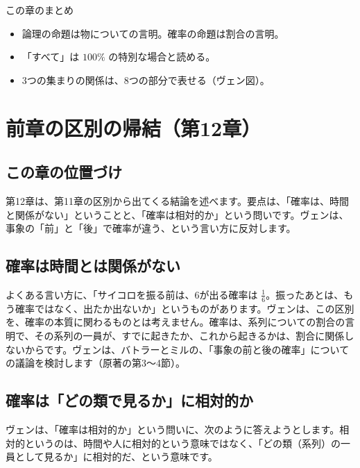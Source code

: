 \documentclass[a4paper,11pt,openany]{ltjsbook}
\begin{document}
\begin{pointbox}{この章のまとめ}
\begin{itemize}[leftmargin=*]
\item 論理の命題は物についての言明。確率の命題は割合の言明。
\item 「すべて」は $100\%$ の特別な場合と読める。
\item 3つの集まりの関係は、8つの部分で表せる（ヴェン図）。
\end{itemize}
\end{pointbox}

\chapter{前章の区別の帰結（第12章）}

\section{この章の位置づけ}

第12章は、第11章の区別から出てくる結論を述べます。要点は、「確率は、時間と関係がない」ということと、「確率は相対的か」という問いです。ヴェンは、事象の「前」と「後」で確率が違う、という言い方に反対します。

\section{確率は時間とは関係がない}

よくある言い方に、「サイコロを振る前は、6が出る確率は $\tfrac16$。振ったあとは、もう確率ではなく、出たか出ないか」というものがあります。ヴェンは、この区別を、確率の本質に関わるものとは考えません。確率は、系列についての割合の言明で、その系列の一員が、すでに起きたか、これから起きるかは、割合に関係しないからです。ヴェンは、バトラーとミルの、「事象の前と後の確率」についての議論を検討します（原著の第3〜4節）。

\section{確率は「どの類で見るか」に相対的か}

ヴェンは、「確率は相対的か」という問いに、次のように答えようとします。相対的というのは、時間や人に相対的という意味ではなく、「どの類（系列）の一員として見るか」に相対的だ、という意味です。
\end{document}
